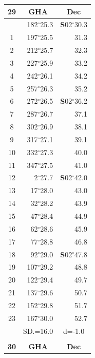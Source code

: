\documentclass[10pt, a4paper]{report}
\begin{document}
\begin{scriptsize}
\noindent
\begin{tabular*}{0.2\textwidth}[t]{@{\extracolsep{\fill}}|c|rr|}
\hline
\multicolumn{1}{|c|}{\rule{0pt}{2.6ex}\textbf{29}} & \multicolumn{1}{c}{\textbf{GHA}} & \multicolumn{1}{c|}{\textbf{Dec}}\\
\hline\rule{0pt}{2.6ex}\noindent
0 & 182$^\circ$25.3 & \textbf{S}02$^\circ$30.3\\
1 & 197$^\circ$25.5 & 31.3\\
2 & 212$^\circ$25.7 & 32.3\\
3 & 227$^\circ$25.9 & \raisebox{0.24ex}{\boldmath$\cdot$~\boldmath$\cdot$~~}33.2\\
4 & 242$^\circ$26.1 & 34.2\\
5 & 257$^\circ$26.3 & 35.2\\[2Pt]
6 & 272$^\circ$26.5 & \textbf{S}02$^\circ$36.2\\
7 & 287$^\circ$26.7 & 37.1\\
8 & 302$^\circ$26.9 & 38.1\\
9 & 317$^\circ$27.1 & \raisebox{0.24ex}{\boldmath$\cdot$~\boldmath$\cdot$~~}39.1\\
10 & 332$^\circ$27.3 & 40.0\\
11 & 347$^\circ$27.5 & 41.0\\[2Pt]
12 & 2$^\circ$27.7 & \textbf{S}02$^\circ$42.0\\
13 & 17$^\circ$28.0 & 43.0\\
14 & 32$^\circ$28.2 & 43.9\\
15 & 47$^\circ$28.4 & \raisebox{0.24ex}{\boldmath$\cdot$~\boldmath$\cdot$~~}44.9\\
16 & 62$^\circ$28.6 & 45.9\\
17 & 77$^\circ$28.8 & 46.8\\[2Pt]
18 & 92$^\circ$29.0 & \textbf{S}02$^\circ$47.8\\
19 & 107$^\circ$29.2 & 48.8\\
20 & 122$^\circ$29.4 & 49.7\\
21 & 137$^\circ$29.6 & \raisebox{0.24ex}{\boldmath$\cdot$~\boldmath$\cdot$~~}50.7\\
22 & 152$^\circ$29.8 & 51.7\\
23 & 167$^\circ$30.0 & 52.7\\
\hline
\rule{0pt}{2.4ex} & \multicolumn{1}{c}{SD.=16.0} & \multicolumn{1}{c|}{d=-1.0}\\
\hline
\multicolumn{1}{c}{}\\[-0.5ex]\hline
\multicolumn{1}{|c|}{\rule{0pt}{2.6ex}\textbf{30}} & \multicolumn{1}{c}{\textbf{GHA}} & \multicolumn{1}{c|}{\textbf{Dec}}\\

\end{tabular*}
\end{scriptsize}
\end{document}

